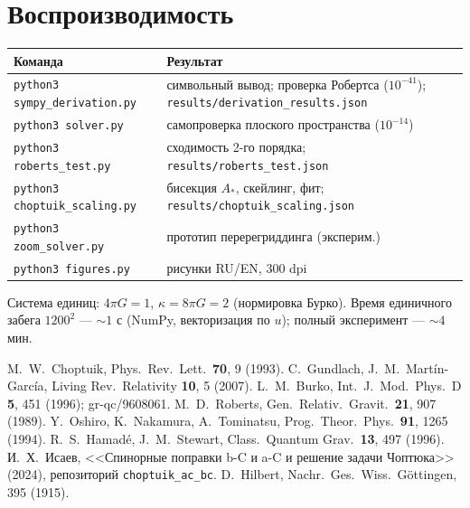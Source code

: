 \documentclass[11pt,a4paper]{article}
\begin{document}
\section{Воспроизводимость}
\begin{table}[h]
\centering\small
\begin{tabularx}{\textwidth}{lY}
\toprule
Команда & Результат\\
\midrule
\texttt{python3 sympy\_derivation.py} & символьный вывод; проверка Робертса
($10^{-41}$); \texttt{results/derivation\_results.json}\\
\texttt{python3 solver.py} & самопроверка плоского пространства ($10^{-14}$)\\
\texttt{python3 roberts\_test.py} & сходимость 2-го порядка;
\texttt{results/roberts\_test.json}\\
\texttt{python3 choptuik\_scaling.py} & бисекция $A_*$, скейлинг, фит;
\texttt{results/choptuik\_scaling.json}\\
\texttt{python3 zoom\_solver.py} & прототип перерегриддинга (эксперим.)\\
\texttt{python3 figures.py} & рисунки RU/EN, 300 dpi\\
\bottomrule
\end{tabularx}
\end{table}

Система единиц: $4\pi G=1$, $\kappa=8\pi G=2$ (нормировка Бурко). Время
единичного забега $1200^2$ --- $\sim1$ с (NumPy, векторизация по $u$);
полный эксперимент --- $\sim4$ мин.

\begin{thebibliography}{9}
 M.~W.~Choptuik, Phys.\ Rev.\ Lett.\ \textbf{70}, 9 (1993).
 C.~Gundlach, J.~M.~Mart\'in-Garc\'ia, Living Rev.\ Relativity \textbf{10}, 5 (2007).
 L.~M.~Burko, Int.\ J.\ Mod.\ Phys.\ D \textbf{5}, 451 (1996); gr-qc/9608061.
 M.~D.~Roberts, Gen.\ Relativ.\ Gravit.\ \textbf{21}, 907 (1989).
 Y.~Oshiro, K.~Nakamura, A.~Tominatsu, Prog.\ Theor.\ Phys.\ \textbf{91}, 1265 (1994).
 R.~S.~Hamad\'e, J.~M.~Stewart, Class.\ Quantum Grav.\ \textbf{13}, 497 (1996).
 И.~Х.~Исаев, <<Спинорные поправки b-C и a-C и решение задачи Чоптюка>> (2024), репозиторий \texttt{choptuik\_ac\_bc}.
 D.~Hilbert, Nachr.\ Ges.\ Wiss.\ G\"ottingen, 395 (1915).
\end{thebibliography}
\end{document}
